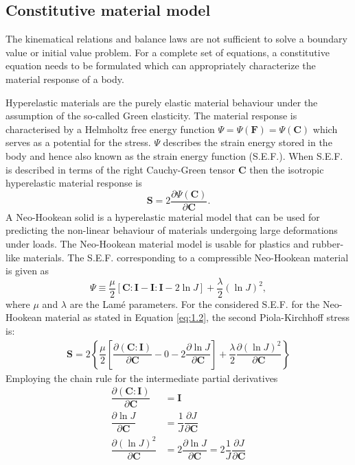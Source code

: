 \subsection{Constitutive material model}
\label{sec:const_law}
The kinematical relations and balance laws are not sufficient to solve a boundary value or initial value problem. For a complete set of equations, a constitutive equation needs to be formulated which can appropriately characterize the material response of a body. \par 

Hyperelastic materials are the purely elastic material behaviour under the assumption of the so-called Green elasticity. The material response is characterised by a Helmholtz free energy function $\Psi = \Psi(\mathbf{F}) = \Psi(\mathbf{C}) $ which serves as a potential for the stress. $\Psi$ describes the strain energy stored in the body and hence also known as the strain energy function (S.E.F.). When S.E.F. is described in terms of the right Cauchy-Green tensor $\mathbf{C}$ then the isotropic hyperelastic material response is 
\begin{equation}
\mathbf{S} = 2 \dfrac{\partial \Psi (\mathbf{C})}{\partial \mathbf{C}}.
\end{equation}
A Neo-Hookean solid is a hyperelastic material model that can be used for predicting the non-linear behaviour of materials undergoing large deformations under loads. The Neo-Hookean material model is usable for plastics and rubber-like materials. The S.E.F. corresponding to a compressible Neo-Hookean material is given as
\begin{equation}
\Psi \equiv \dfrac{\mu}{2} [\mathbf{C} : \mathbf{I} - \mathbf{I} : \mathbf{I} - 2 \ln J] + \dfrac{\lambda}{2} (\ln J)^2,
\label{eq:1.2}
\end{equation}
where $\mu$ and $\lambda$ are the Lam\'e parameters. For the considered S.E.F. for the Neo-Hookean material as stated in Equation \eqref{eq:1.2}, the second Piola-Kirchhoff stress is:
\begin{align}
\mathbf{S} = 2 \left\{ \dfrac{\mu}{2} \left[\dfrac{\partial (\mathbf{C} : \mathbf{I})}{\partial \mathbf{C}} - 0 - 2 \dfrac{\partial \ln J}{\partial \mathbf{C}}\right] + \dfrac{\lambda}{2} \dfrac{\partial (\ln J)^2}{\partial \mathbf{C}} \right\}
\end{align}
Employing the chain rule for the intermediate partial derivatives
\begin{align}
\dfrac{\partial (\mathbf{C} : \mathbf{I})}{\partial \mathbf{C}} &= \mathbf{I} \label{eq:1.4.1} \\ 
\dfrac{\partial \ln J}{\partial \mathbf{C}} &= \dfrac{1}{J} \dfrac{\partial J}{\partial \mathbf{C}} \label{eq:1.4.2} \\ 
\dfrac{\partial (\ln J)^2}{\partial \mathbf{C}} &= 2 \dfrac{\partial \ln J}{\partial \mathbf{C}} = 2 \dfrac{1}{J} \dfrac{\partial J}{\partial \mathbf{C}}
\label{eq:1.4.3}
\end{align}
